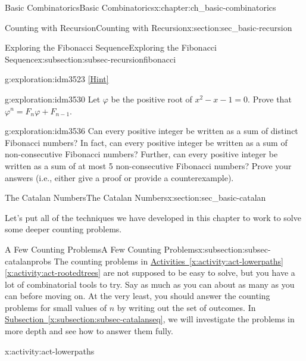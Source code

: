 \documentclass[oneside,10pt,]{book}
\numberwithin{equation}{chapter}
\begin{document}
\begin{chapterptx}{Basic Combinatorics}{}{Basic Combinatorics}{}{}{x:chapter:ch_basic-combinatorics}
\begin{sectionptx}{Counting with Recursion}{}{Counting with Recursion}{}{}{x:section:sec_basic-recursion}
\begin{subsectionptx}{Exploring the Fibonacci Sequence}{}{Exploring the Fibonacci Sequence}{}{}{x:subsection:subsec-recursionfibonacci}
\begin{exploration}{}{g:exploration:idm3523}
\space\hspace*{0pt}\hfill{\tiny\hyperlink{g:hint:idm3527-back}{[Hint]}}\end{exploration}
\begin{exploration}{}{g:exploration:idm3530}%
Let \(\varphi\) be the positive root of \(x^{2} - x - 1 = 0\). Prove that \(\varphi^{n} = F_{n}\varphi + F_{n - 1}\).%
\end{exploration}
\begin{exploration}{}{g:exploration:idm3536}%
Can every positive integer be written as a sum of distinct Fibonacci numbers?  In fact, can every positive integer be written as a sum of non-consecutive Fibonacci numbers?  Further, can every positive integer be written as a sum of at most 5 non-consecutive Fibonacci numbers?  Prove your answers (i.e., either give a proof or provide a counterexample).%
\end{exploration}
\end{subsectionptx}
\end{sectionptx}
%
%
\typeout{************************************************}
\typeout{************************************************}
%
\begin{sectionptx}{The Catalan Numbers}{}{The Catalan Numbers}{}{}{x:section:sec_basic-catalan}
\begin{introduction}{}%
Let's put all of the techniques we have developed in this chapter to work to solve some deeper counting problems.%
\end{introduction}%
%
%
\typeout{************************************************}
\typeout{************************************************}
%
\begin{subsectionptx}{A Few Counting Problems}{}{A Few Counting Problems}{}{}{x:subsection:subsec-catalanprobs}
The counting problems in \hyperref[x:activity:act-lowerpaths]{Activities~\ref{x:activity:act-lowerpaths}\textendash{}\ref{x:activity:act-rootedtrees}} are not supposed to be easy to solve, but you have a lot of combinatorial tools to try.  Say as much as you can about as many as you can before moving on.  At the very least, you should answer the counting problems for small values of \(n\) by writing out the set of outcomes.  In \hyperref[x:subsection:subsec-catalanseq]{Subsection~\ref{x:subsection:subsec-catalanseq}}, we will investigate the problems in more depth and see how to answer them fully.%
\begin{activity}{}{x:activity:act-lowerpaths}%

\end{activity}
\end{subsectionptx}
\end{sectionptx}
\end{chapterptx}
\end{document}
